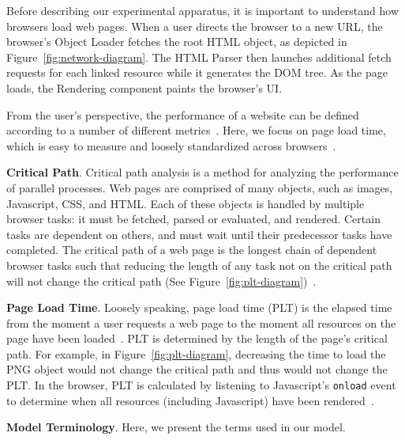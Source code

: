 Before describing our experimental apparatus, it is important to understand how browsers load web pages. When a user directs the browser to a new URL, the browser's Object Loader fetches the root HTML object, as depicted in Figure~\ref{fig:network-diagram}. The HTML Parser then launches additional fetch requests for each linked resource while it generates the DOM tree. As the page loads, the Rendering component paints the browser's UI.

From the user's perspective, the performance of a website can be defined according to a number of different metrics~\cite{above-the-fold,speed-index}. Here, we focus on page load time, which is easy to measure
 and loosely standardized across browsers~\cite{w3c-onload}.

\textbf{Critical Path}. Critical path analysis is a method for analyzing the performance of parallel processes. Web pages are comprised of many objects, such as images, Javascript, CSS, and HTML. Each of these objects is handled by multiple browser tasks: it must be fetched, parsed or evaluated, and rendered. Certain tasks are dependent on others, and must wait until their predecessor tasks have completed. The critical path of a web page is the longest chain of dependent browser tasks such that reducing the length of any task not on the critical path will not change the critical path (See Figure~\ref{fig:plt-diagram})~\cite{sarkar1987partitioning}.

\textbf{Page Load Time}. Loosely speaking, page load time (PLT) is the elapsed time from the moment a user requests a web page to the moment all resources on the page have been loaded~\cite{page-speed}. PLT is determined by the length of the page's critical path.
For example, in Figure~\ref{fig:plt-diagram}, decreasing the time to load the PNG object would not change the critical path and thus would not change the PLT.
In the browser, PLT is calculated by listening to Javascript's  \texttt{onload} event to determine when all resources (including Javascript) have been rendered~\cite{w3c-onload}.

\textbf{Model Terminology}. Here, we present the terms used in our model.
